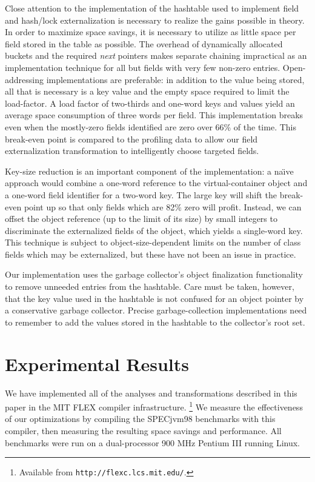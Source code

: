 \documentclass[oribibl]{llncs}
\begin{document}
Close attention to the implementation of the hashtable used to
implement field and hash/lock externalization is
necessary to realize the gains possible in theory.  In order to
maximize space savings, it is necessary to utilize as little space
per field stored in the table as possible.  The overhead of
dynamically allocated buckets and the required {\it next} pointers
makes separate chaining impractical as an implementation technique
for all but fields with very few non-zero entries.  Open-addressing
implementations are preferable: in addition to the value being stored,
all that is necessary is a key value and the empty space required to
limit the load-factor.  A load factor of two-thirds and one-word keys
and values yield an average space consumption of three words per
field.  This implementation breaks even when the mostly-zero fields
identified are zero over 66\% of the time.  This break-even point is
compared to the profiling data to allow our field externalization
transformation to intelligently choose targeted fields.

Key-size reduction is an important component of the implementation:
a na{\"\i}ve approach
would combine a one-word reference to the virtual-container object and a
one-word field identifier for a two-word key.  The large key will
shift the break-even point up so that only fields which are 82\% zero
will profit.  Instead, we can offset the
object reference (up to the limit of its size) by small integers
to discriminate the externalized fields of the object, which yields
a single-word key.  This technique is
subject to object-size-dependent limits on the number
of class fields which may be externalized, but these have not been an
issue in practice.

Our implementation uses the garbage collector's object finalization
functionality to remove unneeded entries from the hashtable.  Care
must be taken, however, that the key value used in the hashtable
is not confused for an object pointer by a conservative garbage
collector.  Precise garbage-collection implementations need to
remember to add the values stored in the hashtable to the
collector's root set.
%
\section{Experimental Results}
\label{sec:results}
%
We have implemented all of the analyses and transformations described
in this paper in the MIT FLEX compiler infrastructure.%
\footnote{Available from {\tt http://flexc.lcs.mit.edu/}.} 
We measure the effectiveness
of our optimizations by compiling the SPECjvm98 benchmarks with 
this compiler, then measuring the resulting space savings and
performance.   All benchmarks were run on a dual-processor 900 MHz
Pentium III running Linux.
%
\end{document}

